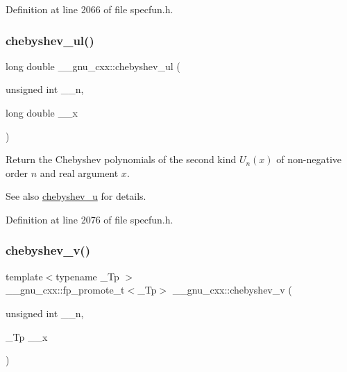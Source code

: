 Definition at line 2066 of file specfun.\+h.

\mbox{\label{group__gnu__math__spec__func_ga11ec202d6aacafba1182e962ecf02978}} 
\subsubsection{\texorpdfstring{chebyshev\+\_\+ul()}{chebyshev\_ul()}}
{\footnotesize\ttfamily long double \+\_\+\+\_\+gnu\+\_\+cxx\+::chebyshev\+\_\+ul (\begin{DoxyParamCaption}\item[{unsigned int}]{\+\_\+\+\_\+n,  }\item[{long double}]{\+\_\+\+\_\+x }\end{DoxyParamCaption})\hspace{0.3cm}{\ttfamily [inline]}}

Return the Chebyshev polynomials of the second kind $ U_n(x) $ of non-\/negative order $ n $ and real argument $ x $.

\begin{DoxySeeAlso}{See also}
\hyperlink{group__gnu__math__spec__func_gafa90c06bdedb8459f20576297cf1608f}{chebyshev\+\_\+u} for details. 
\end{DoxySeeAlso}


Definition at line 2076 of file specfun.\+h.

\mbox{\label{group__gnu__math__spec__func_ga32b7decd0002f542d2c9187c5f0846c6}} 
\subsubsection{\texorpdfstring{chebyshev\+\_\+v()}{chebyshev\_v()}}
{\footnotesize\ttfamily template$<$typename \+\_\+\+Tp $>$ \\
\+\_\+\+\_\+gnu\+\_\+cxx\+::fp\+\_\+promote\+\_\+t$<$\+\_\+\+Tp$>$ \+\_\+\+\_\+gnu\+\_\+cxx\+::chebyshev\+\_\+v (\begin{DoxyParamCaption}\item[{unsigned int}]{\+\_\+\+\_\+n,  }\item[{\+\_\+\+Tp}]{\+\_\+\+\_\+x }\end{DoxyParamCaption})\hspace{0.3cm}{\ttfamily [inline]}}

